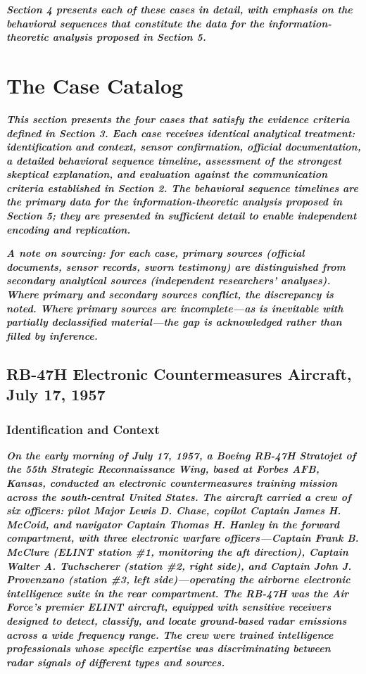 \documentclass[11pt,letterpaper]{article}
\begin{document}
\textbf{\textit{Section 4 presents each of these cases in detail, with emphasis on the behavioral sequences that constitute the data for the information-theoretic analysis proposed in Section 5.}}


\section{The Case Catalog}

\textbf{\textit{This section presents the four cases that satisfy the evidence criteria defined in Section 3. Each case receives identical analytical treatment: identification and context, sensor confirmation, official documentation, a detailed behavioral sequence timeline, assessment of the strongest skeptical explanation, and evaluation against the communication criteria established in Section 2. The behavioral sequence timelines are the primary data for the information-theoretic analysis proposed in Section 5; they are presented in sufficient detail to enable independent encoding and replication.}}


\textbf{\textit{A note on sourcing: for each case, primary sources (official documents, sensor records, sworn testimony) are distinguished from secondary analytical sources (independent researchers' analyses). Where primary and secondary sources conflict, the discrepancy is noted. Where primary sources are incomplete---as is inevitable with partially declassified material---the gap is acknowledged rather than filled by inference.}}


\subsection{RB-47H Electronic Countermeasures Aircraft, July 17, 1957}

\subsubsection{Identification and Context}

\textbf{\textit{On the early morning of July 17, 1957, a Boeing RB-47H Stratojet of the 55th Strategic Reconnaissance Wing, based at Forbes AFB, Kansas, conducted an electronic countermeasures training mission across the south-central United States. The aircraft carried a crew of six officers: pilot Major Lewis D. Chase, copilot Captain James H. McCoid, and navigator Captain Thomas H. Hanley in the forward compartment, with three electronic warfare officers---Captain Frank B. McClure (ELINT station \#1, monitoring the aft direction), Captain Walter A. Tuchscherer (station \#2, right side), and Captain John J. Provenzano (station \#3, left side)---operating the airborne electronic intelligence suite in the rear compartment. The RB-47H was the Air Force's premier ELINT aircraft, equipped with sensitive receivers designed to detect, classify, and locate ground-based radar emissions across a wide frequency range. The crew were trained intelligence professionals whose specific expertise was discriminating between radar signals of different types and sources.}}
\end{document}
